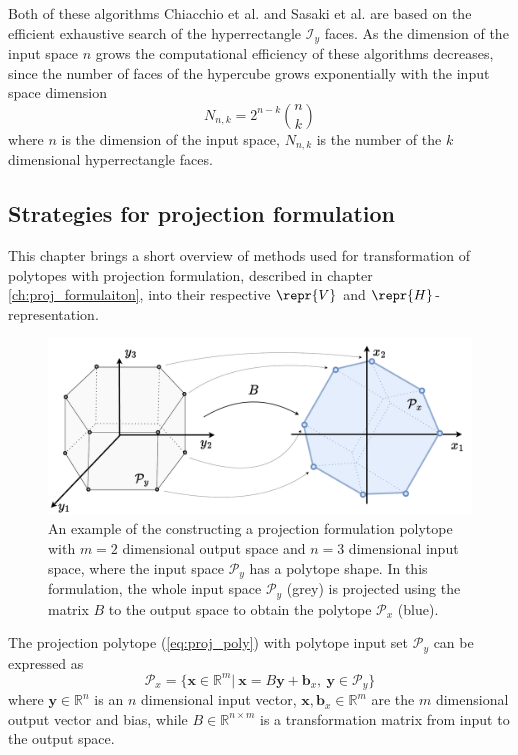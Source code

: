 Both of these algorithms Chiacchio et al. \cite{chiacchio_evaluation_1996} and Sasaki et al. \cite{sasaki_vertex_nodate} are based on the efficient exhaustive search of the hyperrectangle $\mathcal{I}_y$ faces. As the dimension of the input space $n$ grows the computational efficiency of these algorithms decreases, since the number of faces of the hypercube grows exponentially with the input space dimension
$$
N_{n,k}= 2^{n-k}\binom{n}{k}
$$
where $n$ is the dimension of the input space, $N_{n,k}$ is the number of the $k$ dimensional hyperrectangle faces.

\subsection{Strategies for projection formulation}
\label{ch:projection_algos}

This chapter brings a short overview of methods used for transformation of polytopes with projection formulation, described in chapter \ref{ch:proj_formulaiton}, into their respective $\repr{V}$ and $\repr{H}$-representation.

\label{ch:proj_poly_chapter}
\begin{figure}
    \centering
    \includegraphics[width=0.7\linewidth]{Chapters/imgs/proj_poly.pdf}
    \caption{An example of the constructing a projection formulation polytope with $m=2$ dimensional output space and $n=3$ dimensional input space, where the input space $\mathcal{P}_y$ has a polytope shape. In this formulation, the whole input space $\mathcal{P}_y$ (grey) is projected using the matrix $B$ to the output space to obtain the polytope $\mathcal{P}_x$ (blue). }
    \label{fig:proj_poly}
\end{figure}

The projection polytope (\ref{eq:proj_poly}) with polytope input set $\mathcal{P}_y$ can be expressed as
\begin{equation}
    \mathcal{P}_x=\{\bm{x}\in\mathbb{R}^m |~ \bm{x} = B\bm{y} + \bm{b}_x,~\bm{y} \in \mathcal{P}_y  \}
    \label{eq:proj_poly_1}
\end{equation}
where $\bm{y}\in\mathbb{R}^n$ is an $n$ dimensional input vector, $\bm{x},\bm{b}_x\in\mathbb{R}^m$ are the $m$ dimensional output vector and bias, while $B\in\mathbb{R}^{n\times m}$ is a transformation matrix from input to the output space.

